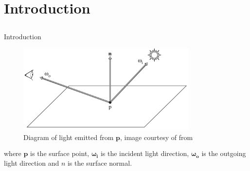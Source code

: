\documentclass{beamer}
\begin{document}
\section{Introduction}
\subsection{ }

\begin{frame}{Introduction}

\begin{figure}[b!]
\includegraphics[width=0.8\textwidth]{img/render_definition}
\caption*{\tiny{Diagram of light emitted from $\mathbf{p}$, image courtesy of from \cite{Pharr:2004}}}
\end{figure}

\vfill

\small{where $\mathbf{p}$ is the surface point, $\boldsymbol{\omega_i}$ is the incident light direction, $\boldsymbol{\omega_o}$ is the outgoing light direction and $n$ is the surface normal. }

\end{frame}
\end{document}
